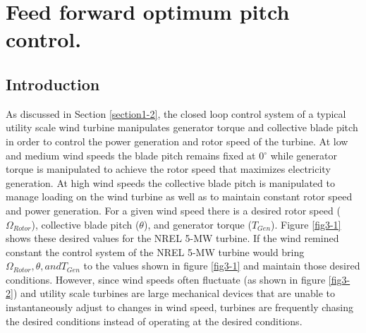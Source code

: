 
\chapter{Feed forward optimum pitch control.} %

\label{Chapter3} %



\section{Introduction} \label{section3-1}
As discussed in Section \ref{section1-2}, the closed loop control system of a typical utility scale wind turbine manipulates generator torque and collective blade pitch in order to control the power generation and rotor speed of the turbine. At low and medium wind speeds the blade pitch remains fixed at 0$^\circ$ while generator torque is manipulated to achieve the rotor speed that maximizes electricity generation. At high wind speeds the collective blade pitch is manipulated to manage loading on the wind turbine as well as to maintain constant rotor speed and power generation. For a given wind speed there is a desired rotor speed ($\Omega_{Rotor}$), collective blade pitch ($\theta$), and generator torque ($T_{Gen}$). Figure \ref{fig3-1} shows these desired values for the NREL 5-MW turbine. If the wind remined constant the control system of the NREL 5-MW turbine would bring $\Omega_{Rotor}, \theta, and T_{Gen}$ to the values shown in figure \ref{fig3-1} and maintain those desired conditions. However, since wind speeds often fluctuate (as shown in figure \ref{fig3-2}) and utility scale turbines are large mechanical devices that are unable to instantaneously adjust to changes in wind speed, turbines are frequently chasing the desired conditions instead of operating at the desired conditions.

